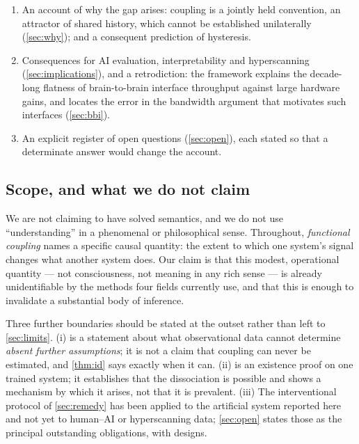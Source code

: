 \documentclass[11pt,a4paper]{article}
\theoremstyle{plain}
\theoremstyle{definition}
\theoremstyle{remark}
\begin{document}
\begin{enumerate}[leftmargin=1.6em, itemsep=3pt]
    \item An account of why the gap arises: coupling is a jointly held convention, an
    attractor of shared history, which cannot be established unilaterally
    (\cref{sec:why}); and a consequent prediction of hysteresis.

    \item Consequences for AI evaluation, interpretability and hyperscanning
    (\cref{sec:implications}), and a retrodiction: the framework explains the decade-long
    flatness of brain-to-brain interface throughput against large hardware gains, and
    locates the error in the bandwidth argument that motivates such interfaces
    (\cref{sec:bbi}).

    \item An explicit register of open questions (\cref{sec:open}), each stated so that a
    determinate answer would change the account.
\end{enumerate}

\subsection{Scope, and what we do not claim}\label{sec:scope}

We are not claiming to have solved semantics, and we do not use ``understanding'' in a
phenomenal or philosophical sense. Throughout, \emph{functional coupling} names a specific
causal quantity: the extent to which one system's signal changes what another system does.
Our claim is that this modest, operational quantity --- not consciousness, not meaning in
any rich sense --- is already unidentifiable by the methods four fields currently use, and
that this is enough to invalidate a substantial body of inference.

Three further boundaries should be stated at the outset rather than left to
\cref{sec:limits}. (i)  is a statement about what observational data cannot
determine \emph{absent further assumptions}; it is not a claim that coupling can never be
estimated, and \cref{thm:id} says exactly when it can. (ii)  is an existence
proof on one trained system; it establishes that the dissociation is possible and shows a
mechanism by which it arises, not that it is prevalent. (iii) The interventional protocol of
\cref{sec:remedy} has been applied to the artificial system reported here and not yet to
human--AI or hyperscanning data; \cref{sec:open} states those as the principal outstanding
obligations, with designs.
\end{document}
